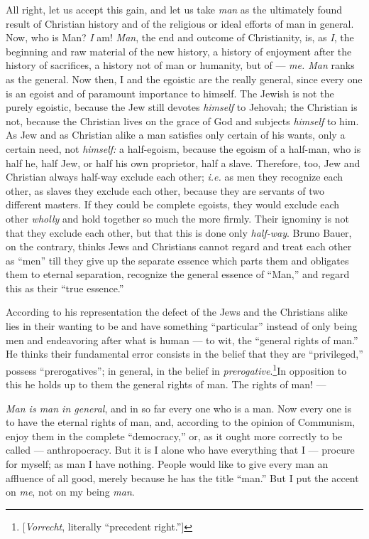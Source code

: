 All right, let us accept this gain, and let us take \textit{man} as the 
ultimately found result of Christian history and of the religious or ideal 
efforts of man in general. Now, who is Man? \textit{I} am! \textit{Man}, the 
end and outcome of Christianity, is, as \textit{I}, the beginning and raw 
material of the new history, a history of enjoyment after the history of 
sacrifices, a history not of man or humanity, but of --- \textit{me. Man} ranks 
as the general. Now then, I and the egoistic are the really general, since 
every one is an egoist and of paramount importance to himself. The Jewish is 
not the purely egoistic, because the Jew still devotes \textit{himself} to 
Jehovah; the Christian is not, because the Christian lives on the grace of God 
and subjects \textit{himself} to him. As Jew and as Christian alike a man 
satisfies only certain of his wants, only a certain need, not 
\textit{himself:} a half-egoism, because the egoism of a half-man, who is half 
he, half Jew, or half his own proprietor, half a slave. Therefore, too, Jew 
and Christian always half-way exclude each other; \textit{i.e.} as men they 
recognize each other, as slaves they exclude each other, because they are 
servants of two different masters. If they could be complete egoists, they 
would exclude each other \textit{wholly} and hold together so much the more 
firmly. Their ignominy is not that they exclude each other, but that this is 
done only \textit{half-way}. Bruno Bauer, on the contrary, thinks Jews and 
Christians cannot regard and treat each other as ``men'' till they give up 
the separate essence which parts them and obligates them to eternal 
separation, recognize the general essence of ``Man,'' and regard this as 
their ``true essence.''

According to his representation the defect of the Jews and the Christians 
alike lies in their wanting to be and have something ``particular'' instead 
of only being men and endeavoring after what is human --- to wit, the 
``general rights of man.'' He thinks their fundamental error consists in the 
belief that they are ``privileged,'' possess ``prerogatives''; in general, 
in the belief in \textit{prerogative}.\footnote{[\textit{Vorrecht}, literally 
``precedent right.''] }In opposition to this he holds up to them the general 
rights of man. The rights of man! ---

\textit{Man is man in general}, and in so far every one who is a man. Now 
every one is to have the eternal rights of man, and, according to the opinion 
of Communism, enjoy them in the complete ``democracy,'' or, as it ought more 
correctly to be called --- anthropocracy. But it is I alone who have everything 
that I --- procure for myself; as man I have nothing. People would like to give 
every man an affluence of all good, merely because he has the title ``man.'' 
But I put the accent on \textit{me}, not on my being \textit{man}.

